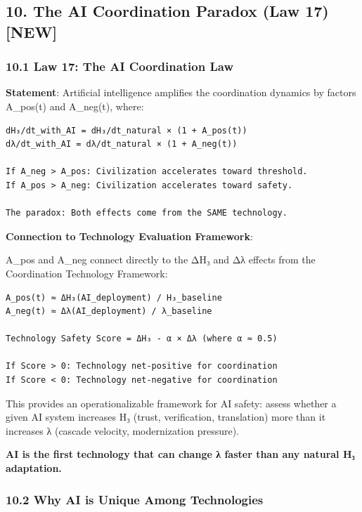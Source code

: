 \documentclass[11pt,letterpaper]{article}
\begin{document}
\subsection{10. The AI Coordination Paradox (Law 17)
{[}NEW{]}}\label{the-ai-coordination-paradox-law-17-new}

\subsubsection{10.1 Law 17: The AI Coordination
Law}\label{law-17-the-ai-coordination-law}

\textbf{Statement}: Artificial intelligence amplifies the coordination
dynamics by factors A\_pos(t) and A\_neg(t), where:

\begin{verbatim}
dH₃/dt_with_AI = dH₃/dt_natural × (1 + A_pos(t))
dλ/dt_with_AI = dλ/dt_natural × (1 + A_neg(t))

If A_neg > A_pos: Civilization accelerates toward threshold.
If A_pos > A_neg: Civilization accelerates toward safety.

The paradox: Both effects come from the SAME technology.
\end{verbatim}

\textbf{Connection to Technology Evaluation Framework}:

A\_pos and A\_neg connect directly to the ΔH₃ and Δλ effects from the
Coordination Technology Framework:

\begin{verbatim}
A_pos(t) ≈ ΔH₃(AI_deployment) / H₃_baseline
A_neg(t) ≈ Δλ(AI_deployment) / λ_baseline

Technology Safety Score = ΔH₃ - α × Δλ (where α ≈ 0.5)

If Score > 0: Technology net-positive for coordination
If Score < 0: Technology net-negative for coordination
\end{verbatim}

This provides an operationalizable framework for AI safety: assess
whether a given AI system increases H₃ (trust, verification,
translation) more than it increases λ (cascade velocity, modernization
pressure).

\textbf{AI is the first technology that can change λ faster than any
natural H₃ adaptation.}

\subsubsection{10.2 Why AI is Unique Among
Technologies}\label{why-ai-is-unique-among-technologies}
\end{document}

